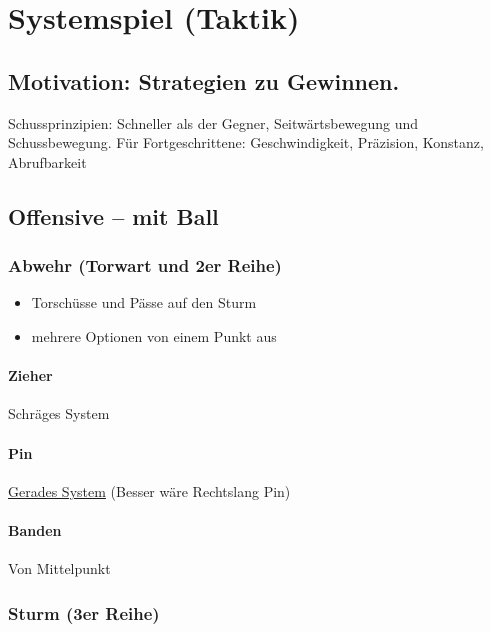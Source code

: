 \chapter{Systemspiel (Taktik)}
\label{taktik}

\section{Motivation: Strategien zu Gewinnen.}

Schussprinzipien: Schneller als der Gegner, Seitwärtsbewegung und Schussbewegung. Für Fortgeschrittene: Geschwindigkeit, Präzision, Konstanz, Abrufbarkeit

\section{Offensive -- mit Ball}

\subsection{Abwehr (Torwart und 2er Reihe)}
\label{taktik:offensive:abwehr}

\begin{itemize}
    \item Torschüsse und Pässe auf den Sturm 
    \item mehrere Optionen von einem Punkt aus
\end{itemize}

\subsubsection{Zieher}
Schräges System

\subsubsection{Pin}
\href{http://ungeblogtkickern.blogspot.de/2014/12/schusssystem-linkslang-pin-aus-der.html}{Gerades System}
(Besser wäre Rechtslang Pin)

\subsubsection{Banden}
Von Mittelpunkt



\subsection{Sturm (3er Reihe)}
\label{taktik:offensive:sturm}

